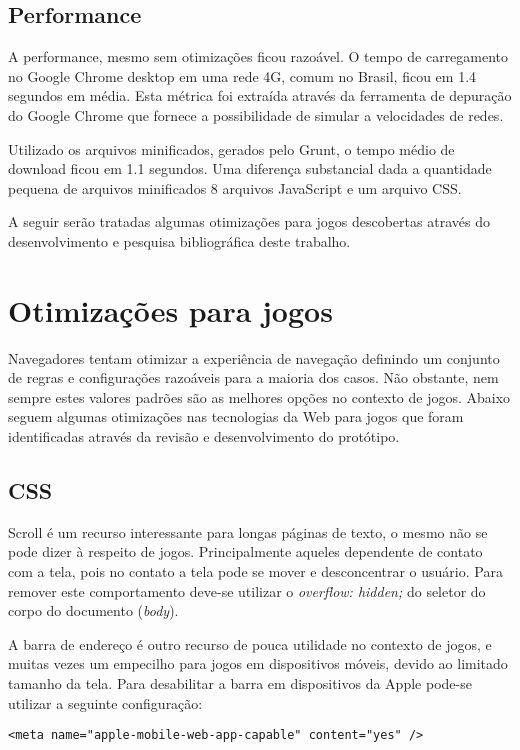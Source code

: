 \subsection{Performance}

A performance, mesmo sem otimizações ficou razoável. O tempo de
carregamento no Google Chrome desktop em uma rede 4G, comum no Brasil,
ficou em 1.4 segundos em média. Esta métrica foi extraída através da
ferramenta de depuração do Google Chrome que fornece a possibilidade
de simular a velocidades de redes.

Utilizado os arquivos minificados, gerados pelo Grunt, o tempo médio
de download ficou em 1.1 segundos. Uma diferença substancial dada a
quantidade pequena de arquivos minificados 8 arquivos JavaScript e um
arquivo CSS.

A seguir serão tratadas algumas otimizações para jogos descobertas
através do desenvolvimento e pesquisa bibliográfica deste trabalho.

\section{Otimizações para jogos} \label{optimizations}
Navegadores tentam otimizar a experiência de navegação definindo
um conjunto de regras e configurações razoáveis para a maioria dos
casos. Não obstante, nem sempre estes valores padrões são as melhores
opções no contexto de jogos. Abaixo seguem algumas otimizações
nas tecnologias da Web para jogos que foram identificadas através da
revisão e desenvolvimento do protótipo.

\subsection{CSS}

Scroll é um recurso interessante para longas páginas de texto,
o mesmo não se pode dizer à respeito de jogos.
Principalmente aqueles dependente de contato com a tela, pois
no contato a tela pode se mover e desconcentrar o usuário. Para
remover este comportamento deve-se utilizar o \textit{overflow:
hidden;} do seletor do corpo do documento (\textit{body}).

A barra de endereço é outro recurso de pouca utilidade no contexto
de jogos, e muitas vezes um empecilho para jogos em dispositivos
móveis, devido ao limitado tamanho da tela. Para desabilitar a barra em
dispositivos da Apple pode-se utilizar a seguinte configuração:

\begin{verbatim}
<meta name="apple-mobile-web-app-capable" content="yes" />
\end{verbatim}

